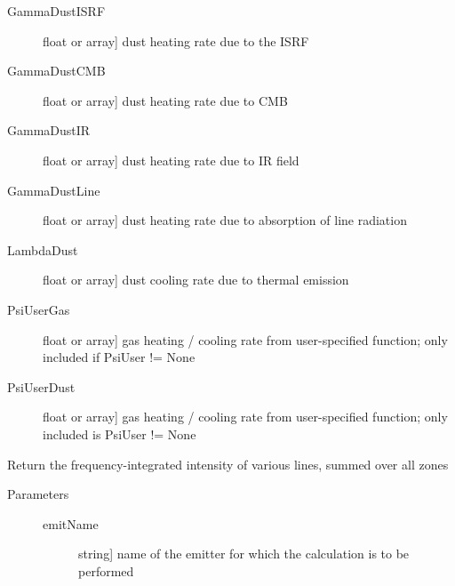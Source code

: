 \documentclass[letterpaper,10pt,english]{sphinxmanual}
\begin{document}
\begin{fulllineitems}
\begin{fulllineitems}
\begin{description}
\begin{description}
\item[{GammaDustISRF}] \leavevmode{[}float or array{]}
dust heating rate due to the ISRF

\item[{GammaDustCMB}] \leavevmode{[}float or array{]}
dust heating rate due to CMB

\item[{GammaDustIR}] \leavevmode{[}float or array{]}
dust heating rate due to IR field

\item[{GammaDustLine}] \leavevmode{[}float or array{]}
dust heating rate due to absorption of line radiation

\item[{LambdaDust}] \leavevmode{[}float or array{]}
dust cooling rate due to thermal emission

\item[{PsiUserGas}] \leavevmode{[}float or array{]}
gas heating / cooling rate from user-specified
function; only included if PsiUser != None

\item[{PsiUserDust}] \leavevmode{[}float or array{]}
gas heating / cooling rate from user-specified
function; only included is PsiUser != None

\end{description}

\end{description}

\end{fulllineitems}


\begin{fulllineitems}
\label{fulldoc:despotic.zonedcloud.lineLum}
Return the frequency-integrated intensity of various lines,
summed over all zones
\begin{description}
\item[{Parameters}] \leavevmode\begin{description}
\item[{emitName}] \leavevmode{[}string{]}
name of the emitter for which the calculation is to be
performed


\end{description}
\end{description}
\end{fulllineitems}
\end{fulllineitems}
\end{document}
